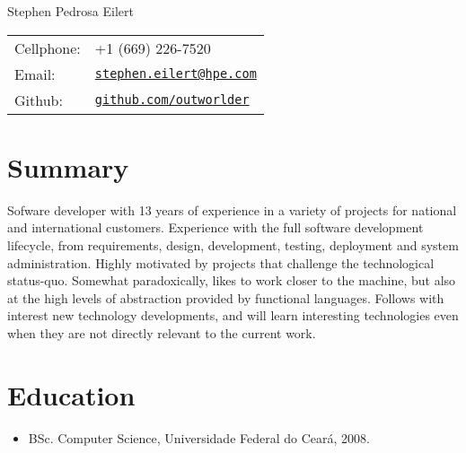 \documentclass[letterpaper]{article}
\def\name{Stephen Pedrosa Eilert}
\begin{document}
\begin{flushright}

{\huge \name}


\vspace{0.20in}
\begin{minipage}{0.45\linewidth}
  \begin{tabular}{ll}
    Cellphone: & +1 (669) 226-7520 \\
    Email: & \href{mailto:stephen.eilert@hpe.com}{\tt stephen.eilert@hpe.com} \\
    Github: & \href{https://github.com/outworlder}{\tt github.com/outworlder}
  \end{tabular}
\end{minipage}
\end{flushright}

\section*{Summary}
  Sofware developer with 13 years of experience in a variety of projects for national and international customers. Experience with the full software development lifecycle, from requirements, design, development, testing, deployment and system administration. Highly motivated by projects that challenge the technological status-quo. Somewhat paradoxically, likes to work closer to the machine, but also at the high levels of abstraction provided by functional languages. Follows with interest new technology developments, and will learn interesting technologies even when they are not directly relevant to the current work.

\section*{Education}

\begin{itemize}
  \item BSc. Computer Science, Universidade Federal do Ceará, 2008.
\end{itemize}
\end{document}
